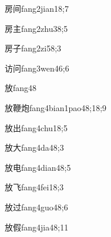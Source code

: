 \begin{verbete}{房间}{fang2jian1}{8;7}
\end{verbete}

\begin{verbete}{房主}{fang2zhu3}{8;5}
\end{verbete}

\begin{verbete}{房子}{fang2zi5}{8;3}
\end{verbete}

\begin{verbete}{访问}{fang3wen4}{6;6}
\end{verbete}

\begin{verbete}{放}{fang4}{8}
\end{verbete}

\begin{verbete}{放鞭炮}{fang4bian1pao4}{8;18;9}
\end{verbete}

\begin{verbete}{放出}{fang4chu1}{8;5}
\end{verbete}

\begin{verbete}{放大}{fang4da4}{8;3}
\end{verbete}

\begin{verbete}{放电}{fang4dian4}{8;5}
\end{verbete}

\begin{verbete}{放飞}{fang4fei1}{8;3}
\end{verbete}

\begin{verbete}{放过}{fang4guo4}{8;6}
\end{verbete}

\begin{verbete}{放假}{fang4jia4}{8;11}
\end{verbete}

